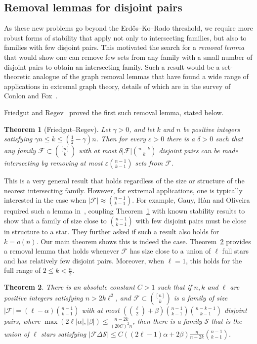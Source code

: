 \documentclass[11pt]{article}
\newtheorem{theorem}{Theorem}[section]
\theoremstyle{definition}
\newcommand{\eps}{\varepsilon}
\newcommand{\al}{\alpha}
\newcommand{\be}{\beta}
\newcommand{\De}{\Delta}
\newcommand{\cS}{\mathcal{S}}
\newcommand{\cF}{\mathcal{F}}
\newcommand{\bekr}{\binom{n-1}{k-1}}
\newcommand{\bnkk}{\binom{n-k-1}{k-1}}
\newcommand{\3}{\bf{3}}
\renewcommand{\l}{\ensuremath{\ell}}
\newcommand{\card}[1]{\left| #1 \right|}
\begin{document}
\subsection{Removal lemmas for disjoint pairs} \label{subsec:intro2}

As these new problems go beyond the Erd\H{o}s--Ko--Rado threshold, we require more robust forms of stability that apply not only to intersecting families, but also to families with few disjoint pairs.  This motivated the search for a \emph{removal lemma} that would show one can remove few sets from any family with a small number of disjoint pairs to obtain an intersecting family.  Such a result would be a set-theoretic analogue of the graph removal lemmas that have found a wide range of applications in extremal graph theory, details of which are in the survey of Conlon and Fox~\cite{cf13}.

Friedgut and Regev~\cite{fr14} proved the first such removal lemma, stated below.

\begin{theorem}[Friedgut--Regev] \label{thm:frremoval}
Let $\gamma > 0$, and let $k$ and $n$ be positive integers satisfying ${\gamma n \le k \le (\tfrac12 - \gamma)n}$.  Then for every $\eps > 0$ there is a $\delta > 0$ such that any family $\cF \subset \binom{[n]}{k}$ with at most $\delta \card{\cF} \binom{n-k}{k}$ disjoint pairs can be made intersecting by removing at most $\eps \binom{n-1}{k-1}$ sets from $\cF$.
\end{theorem}

This is a very general result that holds regardless of the size or structure of the nearest intersecting family.  However, for extremal applications, one is typically interested in the case when $\card{\cF} \approx \binom{n-1}{k-1}$.  For example, Gauy, H\`an and Oliveira required such a lemma in~\cite{gho14}, coupling Theorem~\ref{thm:frremoval} with known stability results to show that a family of size close to $\binom{n-1}{k-1}$ with few disjoint pairs must be close in structure to a star.  They further asked if such a result also holds for $k=o(n)$.  Our main theorem shows this is indeed the case.  Theorem~\ref{thm:removal} provides a removal lemma that holds whenever $\cF$ has size close to a union of $\ell$ full stars and has relatively few disjoint pairs.  Moreover, when $\ell = 1$, this holds for the full range of $2 \le k < \frac{n}{2}$.

\begin{theorem} \label{thm:removal}
There is an absolute constant $C > 1$ such that if $n,k$ and $\l$ are positive integers satisfying $n>2k\l^2$, and $\cF \subset \binom{[n]}{k}$ is a family of size $\card{\cF} = \left(\l - \al \right) \bekr$ with at most $\left(\binom{\l}{2}+\be\right) \bekr \bnkk$ disjoint pairs, where $\max \left(2\l\card{\al}, \card{\be} \right) \le \frac{n-2k}{(20C)^2n}$, then there is a family $\cS$ that is the union of $\l$ stars satisfying $\card{\cF \De \cS} \le C((2\l-1)\al + 2\be)\frac{n}{n-2k}\bekr$.
\end{theorem}
\end{document}
